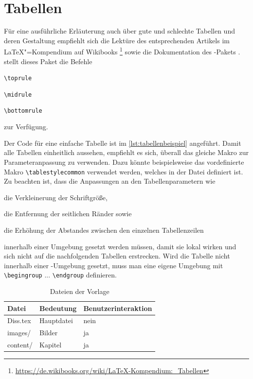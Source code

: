 \section{Tabellen}%
\label{sec:Tabellen}
Für eine ausführliche Erläuterung auch über gute und schlechte Tabellen
und deren Gestaltung empfiehlt sich die Lektüre des entsprechenden Artikels im \LaTeX{}"=Kompendium auf Wikibooks%
\footnote{\url{https://de.wikibooks.org/wiki/LaTeX-Kompendium:_Tabellen}}
sowie die Dokumentation des -Pakets \cite{Fear2005}.
\Ua stellt dieses Paket die Befehle
\begin{itemize*}
	\item \lstinline|\toprule|
	\item \lstinline|\midrule|
	\item \lstinline|\bottomrule|
\end{itemize*}
zur Verfügung.

Der Code für eine einfache Tabelle ist im \cref{lst:tabellenbeispiel} angeführt.
Damit alle Tabellen einheitlich aussehen, empfiehlt es sich,
überall das gleiche Makro zur Parameteranpassung zu verwenden.
Dazu könnte beispielsweise das vordefinierte Makro
\lstinline|\tablestylecommon| verwendet werden, welches in der Datei
 definiert ist.
Zu beachten ist, dass die Anpassungen an den Tabellenparametern wie \zB
\begin{itemize*}
\item die Verkleinerung der Schriftgröße,
\item die Entfernung der seitlichen Ränder sowie
\item die Erhöhung der Abstandes zwischen den einzelnen Tabellenzeilen
\end{itemize*}
innerhalb einer Umgebung gesetzt werden müssen, damit sie lokal wirken und
sich nicht auf die nachfolgenden Tabellen erstrecken.
Wird die Tabelle nicht innerhalb einer -Umgebung
\oae gesetzt, muss man eine eigene Umgebung mit
\lstinline|\begingroup| ... \lstinline|\endgroup|
definieren.

\begin{latex}[caption={Einfache Tabelle in \LaTeX},label={lst:tabellenbeispiel}]
\begin{table}%
	\tablestylecommon%
	\caption{Dateien der Vorlage}%
	\label{tab:tabellenbeispiel}%
	\begin{tabular}{l l l}%
		\toprule%
		Datei       &  Bedeutung    &  Benutzerinteraktion \\%
		\midrule%
		Diss.tex  &  Hauptdatei   &  nein     \\%
		images/   &  Bilder       &  ja       \\%
		content/  &  Kapitel      &  ja       \\%
		\bottomrule%
	\end{tabular}%
\end{table}
\end{latex}

